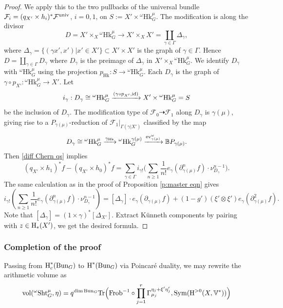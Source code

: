 \documentclass[reqno]{amsart}
\numberwithin{equation}{subsection}
\theoremstyle{definition}
\def\BB{\mathbb{B}}
\def\VV{\mathbb{V}}
\newcommand\cF{\mathcal{F}}
\newcommand{\Bun}{\textup{Bun}}
\newcommand\ev{\textup{ev}}
\newcommand\Frob{\textup{Frob}}
\newcommand\Hk{\mathrm{Hk}}
\newcommand\id{\textup{id}}
\newcommand\Sht{\textup{Sht}}
\newcommand\Sym{\textup{Sym}}
\newcommand{\Tr}{\textup{Tr}}
\newcommand{\univ}{\textup{univ}}
\newcommand{\vol}{\textup{vol}}
\newcommand\ot{\otimes}
\renewcommand\c\circ
\newcommand{\homog}[2]{\textup{H}_{#1}({#2})}  %
\newcommand{\cohog}[2]{\textup{H}^{#1}({#2})}     %
\newcommand{\cohoc}[2]{\textup{H}_{c}^{#1}({#2})}     %
\newcommand{\isom}{\stackrel{\sim}{\to}}
\newcommand\xr{\xrightarrow}
\newcommand\g\gamma
\newcommand\G\Gamma
\newcommand\D\Delta
\renewcommand{\t}{\tau}
\newcommand{\y}{\eta}
\renewcommand{\l}{\lambda}
\newcommand{\om}{\omega}
\newcommand\pl{\partial}
\begin{document}
\begin{proof}
We apply this to the two pullbacks of the universal bundle $\cF_{i}=(q_{X'}\times  h_{i})^{*}\cF^{\univ}$, $i=0,1$, on $S:=X'\times {}^{\om} \Hk^{\mu}_G$. The modification is along the divisor
\begin{equation*}
D=X'\times_{X} {}^{\om} \Hk^{\mu}_G\to X'\times_{X}X'=\coprod_{\g\in \G}\D_{\g},
\end{equation*}
where $\D_{\g}=\{(\g x', x')|x'\in X'\}\subset X'\times X'$ is the graph of $\g\in \G$. Hence $D=\coprod_{\g\in \G}D_{\g}$ where $D_{\g}$ is the preimage of $\D_{\g}$ in $X' \times_X {}^{\om} \Hk^{\mu}_G$. We identify $D_{\g}$ with ${}^{\om} \Hk^{\mu}_G$ using the projection $p_{\Hk}: S\to {}^{\om} \Hk^{\mu}_G$. Each $D_{\g}$ is the graph of $\g\c p_{X'}: {}^{\om} \Hk^{\mu}_G\to X'$. Let 
\begin{equation*}
i_{\g}: D_{\g}\cong{}^{\om} \Hk^{\mu}_G\xr{(\g\c p_{X'},\id)} X'\times {}^{\om} \Hk^{\mu}_G = S
\end{equation*}
be the inclusion of $D_{\g}$.  The modification type of $\cF_{0}\dashrightarrow \cF_{1}$ along $D_{\g}$ is $\g(\mu)$, giving rise to a $P_{\g(\mu)}$-reduction of $\cF_{1}|_{\G(\g|X')}$ classified by the map 
$$D_{\g}\cong{}^{\om} \Hk^{\mu}_G\xr{\g_{\Hk}}{}^{\om} \Hk^{\g(\mu)}_G \xr{\ev_{\g(\mu)}^{\om}}\BB P_{\g(\mu)}.$$  
Then \eqref{diff Chern qs} implies
\begin{equation*}
(q_{X'}\times h_{1})^{*}f-(q_{X'}\times h_{0})^{*}f=\sum_{\g\in \G}i_{\g!}\Big(\sum_{n\ge1} \frac{1}{n!}e_{\g}(\pl^{n}_{\g(\mu)}f)\cdot \nu_{D_{\g}}^{n-1}\Big).\end{equation*}
The same calculation as in the proof of Proposition \ref{p:master eqn} gives
\begin{equation*}
i_{\g!}\left(\sum_{n\ge1} \frac{1}{n!}e_{\g}(\pl^{n}_{\g(\mu)}f)\cdot \nu_{D_{\g}}^{n-1}\right)=[\D_{\g}]\cdot e_{\g}(\pl_{\g(\mu)}f)+(1-g')(\xi'\ot\xi')e_{\g}(\pl^{2}_{\g(\mu)}f).
\end{equation*}
Note that $[\D_{\g}]=(1\times \g)^{*}[\D_{X'}]$. Extract K\"unneth components by pairing with $z\in \homog{*}{X'}$, we get the desired formula.
\end{proof}



\subsubsection{Completion of the proof}
Passing from $\cohoc{*}{\Bun_{G}}$ to $\cohog{*}{\Bun_{G}}$ via Poincar\'e duality, we may rewrite the arithmetic volume as 
\begin{equation*}
\vol({}^\omega \Sht_G^\mu, \eta) = q^{\dim \Bun_{G}}\Tr\Big(\Frob^{-1}\c \prod_{j=1}^{r}\G^{\y_{j} + \xi' \y'_{j}}_{\mu_j}, \Sym(\cohog{>0}{X,\VV^{*}})\Big)
\end{equation*}
\end{document}
